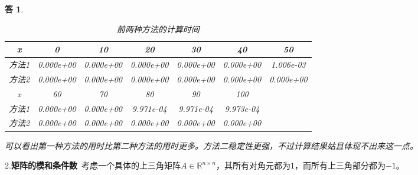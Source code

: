 \documentclass[10pt]{ctexart}
\newtheorem*{answer}{答}
\begin{document}
\begin{answer}
\begin{table}[h]
    \centering
    \begin{tabular}{ccccccc}
        \toprule
        x & 0 & 10 & 20 & 30 & 40 & 50\\
        \midrule
        方法1 &0.000e+00&0.000e+00&0.000e+00&0.000e+00&0.000e+00&1.006e-03\\
        方法2 &0.000e+00&0.000e+00&0.000e+00&0.000e+00&0.000e+00&0.000e+00\\
        \bottomrule
        \toprule
        x & 60 & 70 & 80 & 90 & 100\\
        \midrule
        方法1 & 0.000e+00& 0.000e+00&9.971e-04&9.971e-04&9.973e-04\\
        方法2 &0.000e+00&0.000e+00&0.000e+00&0.000e+00&0.000e+00\\
        \bottomrule
    \end{tabular}
    \caption{前两种方法的计算时间}
\end{table}

可以看出第一种方法的用时比第二种方法的用时更多。方法二稳定性更强，不过计算结果姑且体现不出来这一点。
\end{answer}
2.\textbf{矩阵的模和条件数}\  考虑一个具体的上三角矩阵$A\in \mathbb{R}^{n\times n}$，其所有对角元都为$1$，而所有上三角部分都为$-1$。
\end{document}
